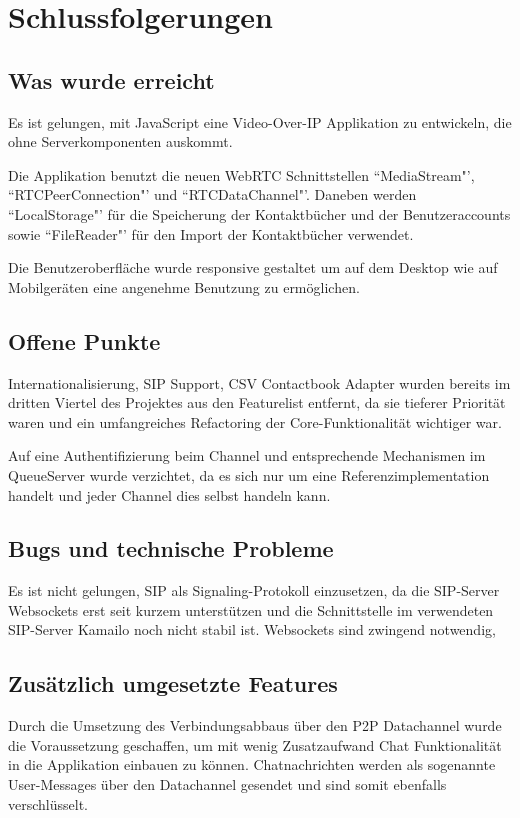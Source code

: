 \chapter{Schlussfolgerungen}
	\section{Was wurde erreicht}
	Es ist gelungen, mit JavaScript eine Video-Over-IP Applikation zu entwickeln, die ohne Serverkomponenten auskommt.
	
	Die Applikation benutzt die neuen WebRTC Schnittstellen ``MediaStream"', ``RTCPeerConnection"' und ``RTCDataChannel"'. Daneben werden ``LocalStorage"' für die Speicherung der Kontaktbücher und der Benutzeraccounts sowie ``FileReader"' für den Import der Kontaktbücher verwendet.
	
	Die Benutzeroberfläche wurde responsive gestaltet um auf dem Desktop wie auf Mobilgeräten eine angenehme Benutzung zu ermöglichen.
	
	
	\section{Offene Punkte}
	Internationalisierung, SIP Support, CSV Contactbook Adapter wurden bereits im dritten Viertel des Projektes aus den Featurelist entfernt, da sie tieferer Priorität waren und ein umfangreiches Refactoring der Core-Funktionalität wichtiger war.
	
	Auf eine Authentifizierung beim Channel und entsprechende Mechanismen im QueueServer wurde verzichtet, da es sich nur um eine Referenzimplementation handelt und jeder Channel dies selbst handeln kann.
	
	
	\section{Bugs und technische Probleme}
	Es ist nicht gelungen, SIP als Signaling-Protokoll einzusetzen, da die SIP-Server Websockets erst seit kurzem unterstützen und die Schnittstelle im verwendeten SIP-Server Kamailo noch nicht stabil ist. Websockets sind zwingend notwendig,
	
	
	\section{Zusätzlich umgesetzte Features}
	Durch die Umsetzung des Verbindungsabbaus über den P2P Datachannel wurde die Voraussetzung geschaffen, um mit wenig Zusatzaufwand Chat Funktionalität in die Applikation einbauen zu können.
	Chatnachrichten werden als sogenannte User-Messages über den Datachannel gesendet und sind somit ebenfalls verschlüsselt.
	
	